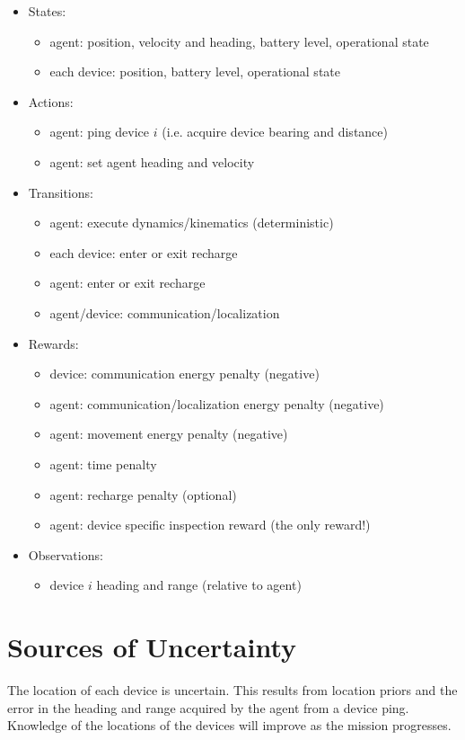 \documentclass[twoside,11pt]{article}
\begin{document}
\begin{itemize}
\item States:
\begin{itemize}
\item agent: position, velocity and heading, battery level, operational state
\item each device: position, battery level, operational state
\end{itemize}
\item Actions:
\begin{itemize}
\item agent: ping device $i$ (i.e. acquire device bearing and distance)
\item agent: set agent heading and velocity
\end{itemize}
\item Transitions:
\begin{itemize}
\item agent: execute dynamics/kinematics (deterministic)
\item each device: enter or exit recharge
\item agent: enter or exit recharge
\item agent/device: communication/localization
\end{itemize}
\item Rewards:
\begin{itemize}
\item device: communication energy penalty (negative)
\item agent: communication/localization energy penalty (negative)
\item agent: movement energy penalty (negative)
\item agent: time penalty
\item agent: recharge penalty (optional)
\item agent: device specific inspection reward (the only reward!)
\end{itemize}
\item Observations:
\begin{itemize}
\item device $i$ heading and range (relative to agent)
\end{itemize}
\end{itemize}

\section{Sources of Uncertainty}
The location of each device is uncertain. This results from location priors and the error in the heading and range acquired by the agent from a device ping. Knowledge of the locations of the devices will improve as the mission progresses.
\end{document}
